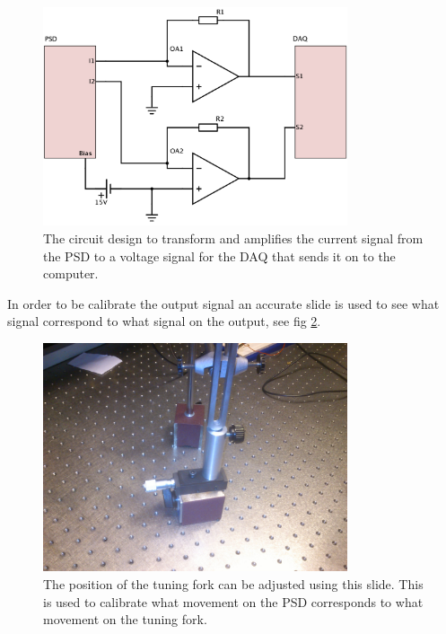 \begin{figure}[h!]
	\centering
	\includegraphics[width=0.8\textwidth]{img/expCircuit}
	\caption{The circuit design to transform and amplifies the current signal from the PSD to a voltage signal for the DAQ that sends it on to the computer.}
	\label{fig:expCircuit}
\end{figure}


In order to be calibrate the output signal an accurate slide is used to see what signal correspond to what signal on the output, see fig \ref{fig:expCalibrateLive}.
\begin{figure}[h!]
	\centering
	\includegraphics[width=0.8\textwidth]{img/expCalibrateLive}
	\caption{The position of the tuning fork can be adjusted using this slide. This is used to calibrate what movement on the PSD corresponds to what movement on the tuning fork.}
	\label{fig:expCalibrateLive}
\end{figure}

